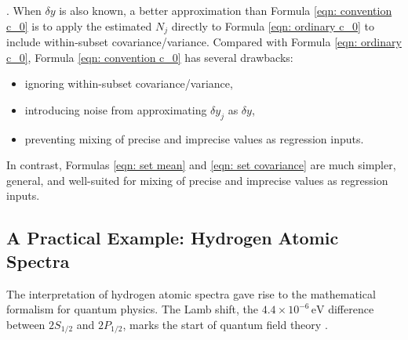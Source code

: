 \documentclass[twoside]{article}
\numberwithin{equation}{section}
\newcommand{\Verbose}{}
\begin{document}
.
When $\delta y$ is also known, a better approximation than Formula \eqref{eqn: convention c_0} is to apply the estimated $N_j$ directly to Formula \eqref{eqn: ordinary c_0} to include within-subset covariance/variance.
Compared with Formula \eqref{eqn: ordinary c_0}, Formula \eqref{eqn: convention c_0} has several drawbacks:
\begin{itemize}
\item ignoring within-subset covariance/variance,
\item introducing noise from approximating $\delta y_j$ as $\delta y$,
\item preventing mixing of precise and imprecise values as regression inputs.
\end{itemize}
In contrast, Formulas \eqref{eqn: set mean} and \eqref{eqn: set covariance} are much simpler, general, and well-suited for mixing of precise and imprecise values as regression inputs.


\ifdefined\Verbose
\subsection{A Practical Example: Hydrogen Atomic Spectra}

The interpretation of hydrogen atomic spectra gave rise to the mathematical formalism for quantum physics.
The Lamb shift, the $4.4\times10^{-6}\,\mathrm{eV}$ difference between $2S_{1/2}$ and $2P_{1/2}$, marks the start of quantum field theory \cite{Lamb_Shift}.
\end{document}
